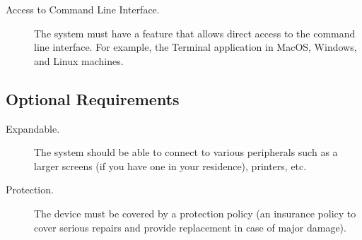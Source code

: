 \begin{description}
    \item[Access to Command Line Interface.] The system must have a feature that allows direct access to the command line interface. For example, the Terminal application in MacOS, Windows, and Linux machines. 
    
\end{description}

\subsection*{Optional Requirements}

\begin{description}
    \item[Expandable.] The system should be able to connect to various peripherals such as a larger screens (if you have one in your residence), printers, etc. 
    
    \item[Protection.] The device must be covered by a protection policy (an insurance policy to cover serious repairs and provide replacement in case of major damage).

\end{description}